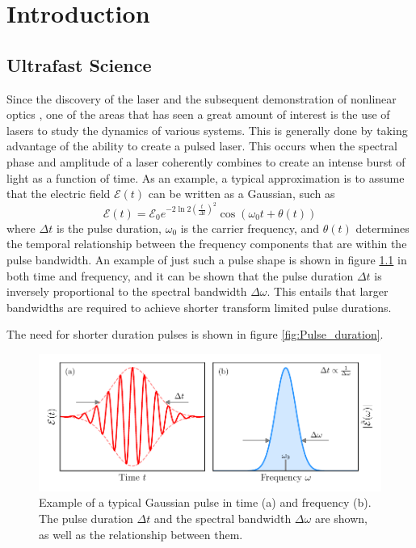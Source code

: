 \chapter{Introduction}
\label{chap:Intro}


\section{Ultrafast Science}

Since the discovery of the laser \cite{schawlowInfraredOpticalMasers1958, maimanStimulatedOpticalRadiation1960} and the subsequent demonstration of nonlinear optics \cite{frankenGenerationOpticalHarmonics1961, armstrongInteractionsLightWaves1962}, one of the areas that has seen a great amount of interest is the use of lasers to study the dynamics of various systems.  This is generally done by taking advantage of the ability to create a pulsed laser.  This occurs when the spectral phase and amplitude of a laser coherently combines to create an intense burst of light as a function of time.  As an example, a typical approximation is to assume that the electric field $\mathcal{E}(t)$ can be written as a Gaussian, such as
\begin{equation}
	\label{eqn:gaussian_pulse}
	\mathcal{E}(t) = \mathcal{E}_0 e^{-2\ln 2(\frac{t}{\Delta t})^2}\cos(\omega_0 t + \theta(t))
\end{equation}
where $\Delta t$ is the pulse duration, $\omega_0$ is the carrier frequency, and $\theta(t)$ determines the temporal relationship between the frequency components that are within the pulse bandwidth.  An example of just such a pulse shape is shown in figure \ref{fig:gaussian_pulse} in both time and frequency, and it can be shown that the pulse duration $\Delta t$ is inversely proportional to the spectral bandwidth $\Delta\omega$.  This entails that larger bandwidths are required to achieve shorter transform limited pulse durations.

The need for shorter duration pulses is shown in figure \ref{fig:Pulse_duration}.


\begin{figure}
	\centering
	\includegraphics[width=1.0\textwidth]{figures/Introduction/gaussian_pulse.pdf}
	\caption[Example of a typical Gaussian pulse in time and frequency]{Example of a typical Gaussian pulse in time (a) and frequency (b).  The pulse duration $\Delta t$ and the spectral bandwidth $\Delta\omega$ are shown, as well as the relationship between them.}
	\label{fig:gaussian_pulse}
\end{figure}

